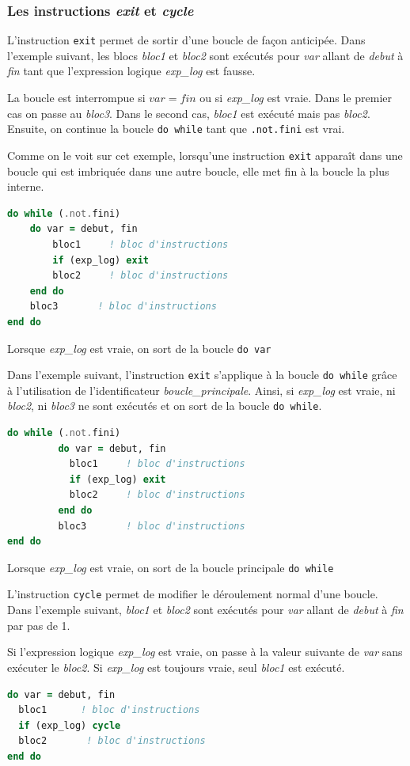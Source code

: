 \documentclass[a4paper,twoside]{article}
\begin{document}
\subsubsection{Les instructions \emph{exit} et \emph{cycle}}

L'instruction \texttt{exit} permet de sortir d'une boucle de façon anticipée. Dans l'exemple suivant, les blocs \emph{bloc1} et \emph{bloc2} sont exécutés pour \emph{var} allant de \emph{debut} à \emph{fin} tant que l'expression logique \emph{exp\_log} est fausse. 

La boucle est interrompue si $var=fin$ ou si \emph{exp\_log} est vraie. Dans le premier cas on passe au \emph{bloc3}. Dans le second cas, \emph{bloc1} est exécuté mais pas \emph{bloc2}. Ensuite, on continue la boucle \texttt{do while} tant que \texttt{.not.fini} est vrai.

Comme on le voit sur cet exemple, lorsqu'une instruction \texttt{exit} appara\^{i}t dans une boucle qui est imbriquée dans une autre boucle, elle met fin à la boucle la plus interne.
\begin{lstlisting}[language=Fortran]
do while (.not.fini)
    do var = debut, fin 
        bloc1     ! bloc d'instructions 
        if (exp_log) exit
        bloc2     ! bloc d'instructions
    end do
    bloc3       ! bloc d'instructions
end do
\end{lstlisting}
Lorsque \emph{exp\_log} est vraie, on sort de la boucle \texttt{do var}


Dans l'exemple suivant, l'instruction \texttt{exit} s'applique à la boucle \texttt{do while} grâce à l'utilisation de l'identificateur \emph{boucle\_principale}. Ainsi, si \emph{exp\_log} est vraie, ni \emph{bloc2}, ni \emph{bloc3} ne sont exécutés et on sort de la boucle \texttt{do while}.
\begin{lstlisting}[language=Fortran]
do while (.not.fini)
         do var = debut, fin 
           bloc1     ! bloc d'instructions 
           if (exp_log) exit
           bloc2     ! bloc d'instructions
         end do
         bloc3       ! bloc d'instructions
end do
\end{lstlisting}
Lorsque \emph{exp\_log} est vraie, on sort de la boucle principale \texttt{do while}

L'instruction \texttt{cycle} permet de modifier le déroulement normal d'une boucle. Dans l'exemple suivant, \emph{bloc1} et \emph{bloc2} sont exécutés pour \emph{var} allant de \emph{debut} à \emph{fin} par pas de 1. 

Si l'expression logique \emph{exp\_log} est vraie, on passe à la valeur suivante de \emph{var} sans exécuter le \emph{bloc2}. Si \emph{exp\_log} est toujours vraie, seul \emph{bloc1} est exécuté.
\begin{lstlisting}[language=Fortran]
do var = debut, fin 
  bloc1      ! bloc d'instructions 
  if (exp_log) cycle
  bloc2       ! bloc d'instructions
end do
\end{lstlisting}
\end{document}
